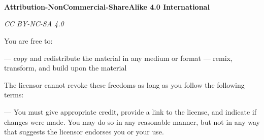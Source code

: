 {\mbox{ }

\begin{Huge}
  \begin{center}
    \tituloPortadaVal
  \end{center}
\end{Huge}

\vfill %

\begin{large}
  \begin{center}
    \textoPrimerSubtituloPortadaVal\ \leavevmode \\\relax \mbox{ } \leavevmode
    \\\relax \mbox{ } \leavevmode \\\relax
    \textoSegundoSubtituloPortadaVal \leavevmode \\[0.3em]
  \end{center}
\end{large}

\vfill %

\begin{large}
  \begin{center}
    \textbf{\institucionVal}\leavevmode \\[0.2em]
    \mbox{ } \leavevmode \\\relax \textbf{\fechaPublicacionVal}
  \end{center}
\end{large}


\newpage
\thispagestyle{empty} \mbox{ }

\vskip 6cm
\begin{center}
\textbf{Attribution-NonCommercial-ShareAlike 4.0 International}

  \emph{CC BY-NC-SA 4.0}
\end{center}
\vskip 5mm
You are free to:
\begin{itemize}


 — copy and redistribute the material in any medium or
format  — remix, transform, and build upon the material
\end{itemize}

The licensor
  cannot revoke these freedoms as long as you follow
  the following terms:

  \begin{itemize}
     — You must give appropriate credit, provide a
  link to the license, and indicate if changes were made. You may do so in any
  reasonable manner, but not in any way that suggests the licensor endorses you
  or your use.


\end{itemize}}
